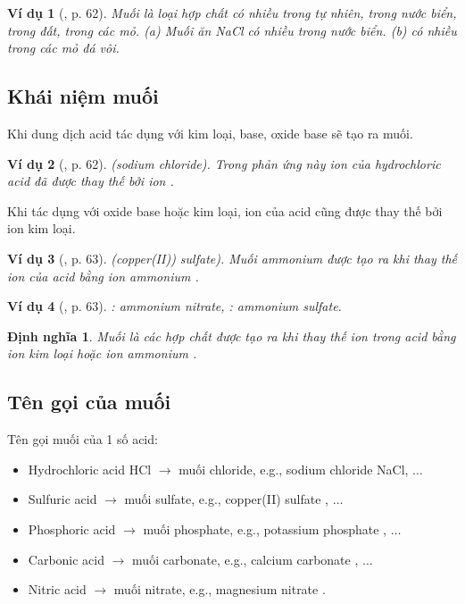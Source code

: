 \documentclass{article}
\newtheorem{dinhnghia}{Định nghĩa}
\newtheorem{vidu}{Ví dụ}
\begin{document}
\begin{vidu}[\cite{SGK_KHTN_8_Canh_Dieu}, p. 62]
	Muối là loại hợp chất có nhiều trong tự nhiên, trong nước biển, trong đất, trong các mỏ. (a) Muối ăn {\rm NaCl} có nhiều trong nước biển. (b) {\rm{}} có nhiều trong các mỏ đá vôi.
\end{vidu}

\subsection{Khái niệm muối}
Khi dung dịch acid tác dụng với kim loại, base, oxide base sẽ tạo ra muối.

\begin{vidu}[\cite{SGK_KHTN_8_Canh_Dieu}, p. 62]
	{\rm{}} (sodium chloride). Trong phản ứng này ion {\rm{}} của hydrochloric acid đã được thay thế bởi ion {\rm{}}.
\end{vidu}
Khi tác dụng với oxide base hoặc kim loại, ion  của acid cũng được thay thế bởi ion kim loại.

\begin{vidu}[\cite{SGK_KHTN_8_Canh_Dieu}, p. 63]
	{\rm{}} (copper(II)) sulfate). Muối ammonium được tạo ra khi thay thế ion {\rm{}} của acid bằng ion ammonium {\rm{}}.
\end{vidu}

\begin{vidu}[\cite{SGK_KHTN_8_Canh_Dieu}, p. 63]
	{\rm{}}: ammonium nitrate, {\rm{}}: ammonium sulfate.
\end{vidu}

\begin{dinhnghia}
	{\rm Muối} là các hợp chất được tạo ra khi thay thế ion {\rm{}} trong acid bằng ion kim loại hoặc ion ammonium {\rm{}}.
\end{dinhnghia}

\subsection{Tên gọi của muối}
Tên gọi muối của 1 số acid:
\begin{itemize}
	\item Hydrochloric acid HCl $\to$ muối chloride, e.g., sodium chloride NaCl, $\ldots$
	\item Sulfuric acid  $\to$ muối sulfate, e.g., copper(II) sulfate , $\ldots$
	\item Phosphoric acid  $\to$ muối phosphate, e.g., potassium phosphate , $\ldots$
	\item Carbonic acid  $\to$ muối carbonate, e.g., calcium carbonate , $\ldots$
	\item Nitric acid  $\to$ muối nitrate, e.g., magnesium nitrate .
\end{itemize}
\end{document}
